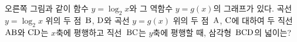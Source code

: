 \noindent\begin{minipage}[t]{0.58\linewidth}\vspace{0pt}\raggedright 오른쪽 그림과 같이 함수 $y=\log_2 x$와 그 역함수 $y=g(x)$의 그래프가 있다. 곡선 $y=\log_2 x$ 위의 두 점~$\mathrm{B}$, $\mathrm{D}$와 곡선 $y=g(x)$ 위의 두 점~$\mathrm{A}$, $\mathrm{C}$에 대하여 두 직선~$\mathrm{AB}$와 $\mathrm{CD}$는 $x$축에 평행하고 직선~$\mathrm{BC}$는 $y$축에 평행할 때, 삼각형~$\mathrm{BCD}$의 넓이는? \end{minipage}\hfill\begin{minipage}[t]{0.4\linewidth}\vspace{0pt}\centering \resizebox{\ifdim\width>\linewidth\linewidth\else\width\fi}{!}{}\end{minipage}\par
{}
